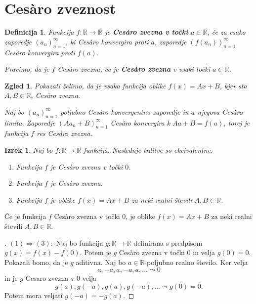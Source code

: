 \documentclass[10pt,hyperref={unicode}]{beamer}
\newtheorem{izrek}{Izrek}
\newtheorem{definicija}{Definicija}
\newtheorem{zgled}{Zgled}
\newenvironment{dokaz}{\begin{proof}[\bfseries\upshape\proofname]}{\end{proof}}
\begin{document}
\section{Ces\`{a}ro zveznost}

\begin{frame}
    \begin{definicija}
        Funkcija $f: \mathbb{R} \rightarrow \mathbb{R}$ je \textbf{Ces\`{a}ro zvezna v točki $a \in \mathbb{R}$}, če za vsako zaporedje $(a_n)_{n=1}^{\infty}$, ki Ces\`{a}ro konvergira proti $a$, zaporedje $(f(a_n))_{n=1}^{\infty}$ Ces\`{a}ro konvergira proti $f(a)$. 
        
        Pravimo, da je $f$ Ces\`{a}ro zvezna, če je \textbf{Ces\`{a}ro zvezna} v vsaki točki $a \in \mathbb{R}$.
    \end{definicija}
    \pause
    \begin{zgled}
        Pokazati želimo, da je vsaka funkcija oblike $f(x) = Ax + B$, kjer sta $A, B \in \mathbb{R}$, Ces\`{a}ro zvezna. 
        \pause

        Naj bo $(a_n)_{n=1}^{\infty}$ poljubno Ces\`{a}ro konvergentno zaporedje in $a$ njegova Ces\`{a}ro limita. Zaporedje $(A a_n + B)_{n=1}^{\infty}$ Ces\`{a}ro konvergira k $A a + B = f(a)$, torej je funkcija $f$ res Ces\`{a}ro zvezna.
    \end{zgled}
\end{frame}

\begin{frame}
    \begin{izrek}
        \label{klaszvez}
        Naj bo $f: \mathbb{R} \rightarrow \mathbb{R}$ funkcija. Naslednje trditve so ekvivalentne.
        \begin{enumerate}
            \item Funkcija $f$ je Ces\`{a}ro zvezna v točki $0$.
            \item Funkcija $f$ je Ces\`{a}ro zvezna.
            \item Funkcija $f$ je oblike $f(x) = Ax + B$ za neki realni števili $A, B \in \mathbb{R}$.
        \end{enumerate}
    \end{izrek}
\end{frame}

\begin{frame}
    \begin{block}{}
        Če je funkcija $f$ Ces\`{a}ro zvezna v točki $0$, je oblike $f(x) = Ax + B$ za neki realni števili $A, B \in \mathbb{R}$.
    \end{block}
    \begin{dokaz}\renewcommand{\qedsymbol}{}
        $(1) \Rightarrow (3): $ Naj bo funkcija $g: \mathbb{R} \rightarrow \mathbb{R}$ definirana s predpisom $g(x) = f(x) - f(0)$. Potem je $g$ Ces\`{a}ro zvezna v točki $0$ in velja $g(0) = 0$. Pokazali bomo, da je $g$ aditivna.
        \pause
        Naj bo $a \in \mathbb{R}$ poljubno realno število. Ker velja $$a, -a, a, -a, a, \ldots \leadsto 0$$ in je $g$ Cesaro zvezna v $0$ velja $$g(a), g(-a), g(a), g(-a), \ldots \leadsto g(0) = 0.$$ 
        \pause 
        Potem mora veljati $g(-a) = -g(a)$. 
    \end{dokaz}
\end{frame}
\end{document}
